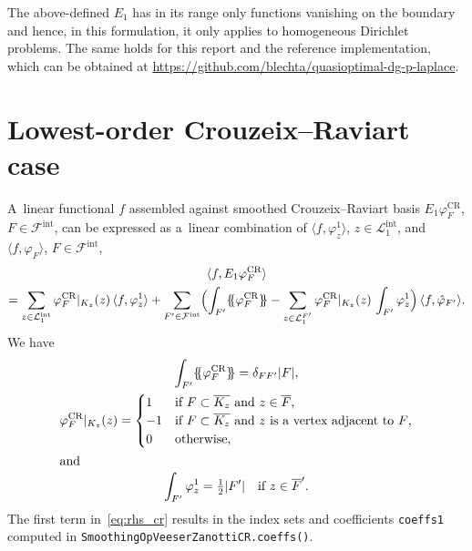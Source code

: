 \documentclass[oneeqnum]{siamart220329}
\newcommand*{\ldblbrace}{\{\mskip-5mu\{}
\newcommand*{\rdblbrace}{\}\mskip-5mu\}}
\begin{document}
The above-defined $E_1$ has in its range only functions vanishing on the
boundary and hence, in this formulation, it only applies to homogeneous
Dirichlet problems. The same holds for this report and the reference
implementation, which can be obtained at
\url{https://github.com/blechta/quasioptimal-dg-p-laplace}.


\section{Lowest-order Crouzeix--Raviart case}
%
A~linear functional $f$ assembled against smoothed Crouzeix--Raviart basis $E_1
\varphi^{\mathrm{CR}}_F$, $F\in\mathcal{F}^{\mathrm{int}}$, can be expressed as
a~linear combination of $\langle f, \varphi^1_z \rangle$,
$z\in\mathcal{L}^{\mathrm{int}}_1$, and $\langle f, \varphi_F \rangle$,
$F\in\mathcal{F}^{\mathrm{int}}$,
%
\begin{multline}
  \label{eq:rhs_cr}
  \langle f, E_1 \varphi^{\mathrm{CR}}_F \rangle
  \\
  = \sum_{z\in\mathcal{L}^{\mathrm{int}}_1} \varphi^{\mathrm{CR}}_F|_{K_z}(z)
    \, \langle f, \varphi^1_z \rangle
  + \sum_{F'\in \mathcal{F}^{\mathrm{int}}} \Bigl( \int_{F'} \ldblbrace
    \varphi^{\mathrm{CR}}_F \rdblbrace - \sum_{z\in\mathcal{L}^{F'}_1}
    \varphi^{\mathrm{CR}}_F|_{K_z}(z) \, \int_{F'} \varphi_z^1 \Bigr)
    \, \langle f, \hat\varphi_{F'} \rangle.
\end{multline}
%
We have
%
\begin{subequations}
\begin{gather}
  \label{eq:cr_1}
  \int_{F'} \ldblbrace \varphi^{\mathrm{CR}}_F \rdblbrace = \delta_{FF'} |F|, \\
  \label{eq:cr_2}
  \varphi^{\mathrm{CR}}_F|_{K_z}(z) = \begin{cases}
    1  & \text{if $F\subset\overline{K_z}$ and $z\in\overline{F}$,} \\
    -1 & \text{if $F\subset\overline{K_z}$ and $z$ is a~vertex adjacent to~$F$,} \\
    0  & \text{otherwise,}
  \end{cases} \\
  \shortintertext{and}
  \label{eq:cr_3}
  \int_{F'} \varphi^1_z = \tfrac12 |F'| \quad \text{if $z\in\overline F'$.}
\end{gather}
\end{subequations}
%
The first term in~\cref{eq:rhs_cr} results in the index sets and coefficients
\texttt{coeffs1} computed in \texttt{SmoothingOpVeeserZanottiCR.coeffs()}.
\end{document}

